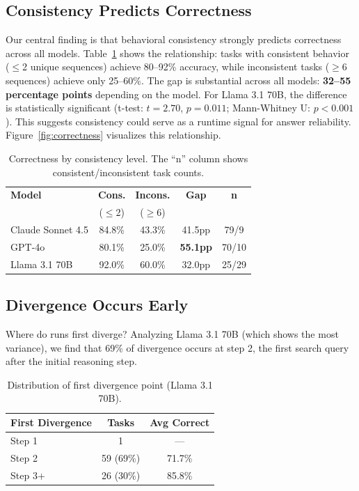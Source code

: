 \documentclass{article}
\begin{document}
\subsection{Consistency Predicts Correctness}

Our central finding is that behavioral consistency strongly predicts correctness across all models. Table~\ref{tab:consistency} shows the relationship: tasks with consistent behavior ($\leq$2 unique sequences) achieve 80--92\% accuracy, while inconsistent tasks ($\geq$6 sequences) achieve only 25--60\%. The gap is substantial across all models: \textbf{32--55 percentage points} depending on the model. For Llama 3.1 70B, the difference is statistically significant (t-test: $t=2.70$, $p=0.011$; Mann-Whitney U: $p<0.001$). This suggests consistency could serve as a runtime signal for answer reliability. Figure~\ref{fig:correctness} visualizes this relationship.

\begin{table}[h]
\centering
\small
\caption{Correctness by consistency level. The ``n'' column shows consistent/inconsistent task counts.}
\label{tab:consistency}
\begin{tabular}{lcccc}
\toprule
\textbf{Model} & \textbf{Cons.} & \textbf{Incons.} & \textbf{Gap} & \textbf{n} \\
 & ($\leq$2) & ($\geq$6) & & \\
\midrule
Claude Sonnet 4.5 & 84.8\% & 43.3\% & 41.5pp & 79/9 \\
GPT-4o & 80.1\% & 25.0\% & \textbf{55.1pp} & 70/10 \\
Llama 3.1 70B & 92.0\% & 60.0\% & 32.0pp & 25/29 \\
\bottomrule
\end{tabular}
\end{table}

\subsection{Divergence Occurs Early}

Where do runs first diverge? Analyzing Llama 3.1 70B (which shows the most variance), we find that 69\% of divergence occurs at step 2, the first search query after the initial reasoning step.

\begin{table}[h]
\centering
\caption{Distribution of first divergence point (Llama 3.1 70B).}
\label{tab:divergence}
\begin{tabular}{lcc}
\toprule
\textbf{First Divergence} & \textbf{Tasks} & \textbf{Avg Correct} \\
\midrule
Step 1 & 1 & --- \\
Step 2 & 59 (69\%) & 71.7\% \\
Step 3+ & 26 (30\%) & 85.8\% \\
\bottomrule
\end{tabular}
\end{table}
\end{document}
